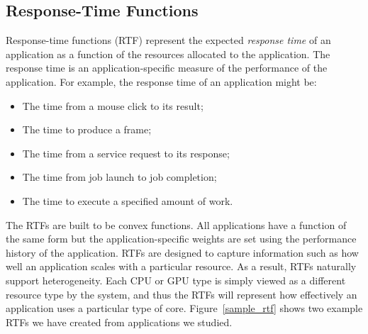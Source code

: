 \subsection{Response-Time Functions}

Response-time functions (RTF) represent the expected \emph{response
  time} of an application as a function of the resources allocated to
the application. The response time is an application-specific measure
of the performance of the application.  For example, the response time
of an application might be:
    \begin{itemize}\itemsep0pt \parskip0pt 
    \item The time from a mouse click to its result;
    \item The time to produce a frame;
    \item The time from a service request to its response;
    \item The time from job launch to job completion;
    \item The time to execute a specified amount of work.
    \end{itemize}

The RTFs are built to be convex functions.  All applications have a
function of the same form but the application-specific weights are set
using the performance history of the application.  RTFs are designed
to capture information such as how well an application scales with a
particular resource. As a result, RTFs naturally support
heterogeneity.  Each CPU or GPU type is simply viewed as a different
resource type by the system, and thus the RTFs will represent how
effectively an application uses a particular type of
core. Figure~\ref{sample_rtf} shows two example RTFs we have created
from applications we studied.

